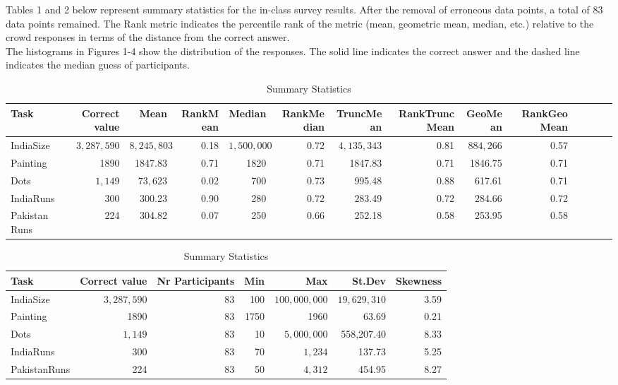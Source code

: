 \documentclass{article}
\begin{document}
Tables 1 and 2 below represent summary statistics for the in-class survey results. After the removal of erroneous data points, a total of 83 data points remained. The Rank metric indicates the percentile rank of the metric (mean, geometric mean, median, etc.) relative to the crowd responses in terms of the distance from the correct answer. \\

The histograms in Figures 1-4 show the distribution of the responses. The solid line indicates the correct answer and the dashed line indicates the median guess of participants.


\begin{table}[h]
\begin{adjustbox}{max width=\textwidth}
\begin{tabular}{|l|r||r|r|r|r|r|r|r|r|r|r|r|r}
\hline
Task & Correct value & Mean & RankMean & Median & RankMedian & TruncMean & RankTruncMean & GeoMean & RankGeoMean \\
\hline
IndiaSize & $3,287,590$ & $8,245,803$ & 0.18 & $1,500,000$ & 0.72 & $4,135,343$ & 0.81 & $884,266$ & 0.57 \\
Painting & 1890 & 1847.83 & 0.71 & 1820 & 0.71 & 1847.83 & 0.71 & 1846.75 & 0.71 \\
Dots & $1,149$ & $73,623$ & 0.02 & 700 & 0.73 & 995.48 & 0.88 & 617.61 & 0.71\\
IndiaRuns & 300 & 300.23 & 0.90 & 280 & 0.72 & 283.49 &     0.72 & 284.66 & 0.72\\
PakistanRuns & 224 & 304.82 & 0.07 & 250 & 0.66 &     252.18 & 0.58 & 253.95 & 0.58  \\
\hline
\end{tabular}
\end{adjustbox}
\caption{Summary Statistics}
\label{stats}
\end{table} 



\begin{table}[h]
\begin{adjustbox}{max width=\textwidth}
\begin{tabular}{|l||r|r||r|r|r|r|}
\hline
Task & Correct value & Nr Participants & Min & Max & St.Dev & Skewness \\
\hline
IndiaSize & $3,287,590$ & 83 & 100 & $100,000,000$ & $19,629,310$ & 3.59\\
Painting & 1890 &  83 & 1750  & 1960 & 63.69 & 0.21 \\
Dots  & $1,149$ &  83 & 10  & $5,000,000$ & 558,207.40 & 8.33 \\
IndiaRuns & 300 &  83 & 70 & $1,234$ & 137.73 & 5.25\\
PakistanRuns & 224 &  83 & 50  &  $4,312$ &  454.95 & 8.27 \\
\hline
\end{tabular}
\end{adjustbox}
\caption{Summary Statistics}
\label{stats}
\end{table} 
\end{document}
